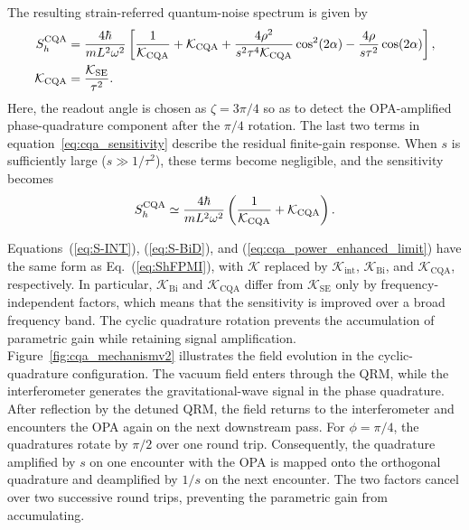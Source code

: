 \documentclass{iopjournal}
\begin{document}
The resulting strain-referred quantum-noise spectrum is given by
\begin{align}
S_h^{\rm CQA}
&=
\frac{4\hbar}{mL^2\omega^2}
\left[
\frac{1}{\mathcal K_{\rm CQA}}
+
\mathcal K_{\rm CQA}
+
\frac{4\rho^2}
{s^2\tau^4\mathcal K_{\rm CQA}}
\cos^2(2\alpha)
-
\frac{4\rho}{s\tau^2}
\cos(2\alpha)
\right],\label{eq:cqa_sensitivity}
\\
\mathcal K_{\rm CQA}
&=
\frac{\mathcal K_{\rm SE}}{\tau^2}.
\end{align}
Here, the readout angle is chosen as \(\zeta=3\pi/4\) so as to detect
the OPA-amplified phase-quadrature component after the \(\pi/4\)
rotation.
The last two terms in equation~\eqref{eq:cqa_sensitivity} describe the residual finite-gain response. When \(s\) is sufficiently large (\(s\gg1/\tau^2\)), these terms become negligible, and the sensitivity becomes
\begin{align}
    S_h^{\rm CQA}
    \simeq
    \frac{4\hbar}{mL^2\omega^2}
    \left(
        \frac{1}{\mathcal{K_\mathrm{CQA}}}
        +
        \mathcal{K_\mathrm{CQA}}
    \right).
    \label{eq:cqa_power_enhanced_limit}
\end{align}

Equations~(\ref{eq:S-INT}), (\ref{eq:S-BiD}), and
(\ref{eq:cqa_power_enhanced_limit}) have the same form as
Eq.~(\ref{eq:ShFPMI}), with $\mathcal{K}$ replaced by
$\mathcal{K}_{\mathrm{int}}$, $\mathcal{K}_{\mathrm{Bi}}$, and
$\mathcal{K}_{\mathrm{CQA}}$, respectively. In particular,
$\mathcal{K}_{\mathrm{Bi}}$ and $\mathcal{K}_{\mathrm{CQA}}$ differ
from $\mathcal{K}_{\mathrm{SE}}$ only by frequency-independent factors,
which means that the sensitivity is improved over a broad frequency band. The cyclic quadrature rotation prevents the accumulation of parametric gain while retaining signal amplification. Figure~\ref{fig:cqa_mechanismv2} illustrates the field evolution in the cyclic-quadrature configuration. The vacuum field enters through the QRM, while the interferometer generates the gravitational-wave signal in the phase quadrature. After reflection by the detuned QRM, the field returns to the interferometer and encounters the OPA again on the next downstream pass. For \(\phi=\pi/4\), the quadratures rotate by \(\pi/2\) over one round trip. Consequently, the quadrature amplified by \(s\) on one encounter with the OPA is mapped onto the orthogonal quadrature and deamplified by \(1/s\) on the next encounter. The two factors cancel over two successive round trips, preventing the parametric gain from accumulating. 
\end{document}
